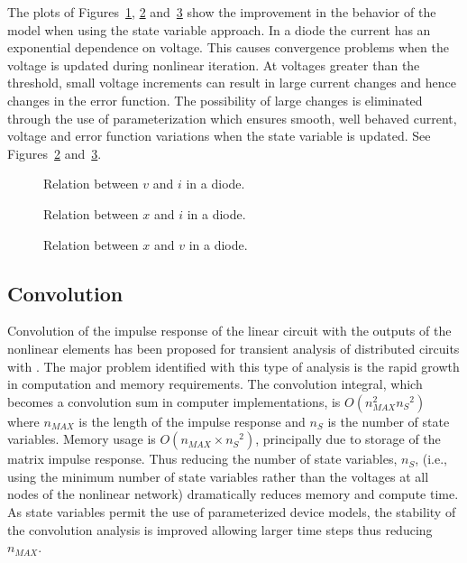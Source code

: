 The plots of Figures~\ref{fig:vi}, \ref{fig:xi} and~\ref{fig:xv} show
the improvement in the behavior of the model when using the state
variable approach. In a diode the current has an exponential
dependence on voltage. This causes convergence problems when the
voltage is updated during nonlinear iteration. At voltages greater
than the threshold, small voltage increments can result in large
current changes and hence changes in the error function. The
possibility of large changes is eliminated through the use of
parameterization which ensures smooth, well behaved current, voltage
and error function variations when the state variable is updated. See
Figures~\ref{fig:xi} and~\ref{fig:xv}.
%
\begin{figure}[htpb]
\centerline{\epsfxsize=3.5in }
\caption{Relation between $v$ and $i$ in a diode.} \label{fig:vi}
\end{figure}
%
\begin{figure}[htpb]
\centerline{\epsfxsize=3.5in }
\caption{Relation between $x$ and $i$ in a diode.} \label{fig:xi}
\end{figure}
%
\begin{figure}[htpb]
\centerline{\epsfxsize=3.5in }
\caption{Relation between $x$ and $v$ in a diode.} \label{fig:xv}
\end{figure}
%



\subsection{Convolution}

Convolution of the impulse response of the linear circuit with the
outputs of the nonlinear elements has been proposed for transient
analysis of distributed circuits with
\cite{theta,Brazil:New,gamma,delta,alpha,basel:paper,Blazeck:Mittra}. The
major problem identified with this type of analysis is the rapid
growth in computation and memory requirements. The convolution
integral, which becomes a convolution sum in computer implementations,
is $O(n_{MAX}^2 {n_S}^2)$ where $n_{MAX}$ is the length of the impulse
response and $n_S$ is the number of state variables. Memory usage is
$O(n_{MAX} \times {n_S}^2)$, principally due to storage of the matrix
impulse response. Thus reducing the number of state variables, $n_S$,
(i.e., using the minimum number of state variables rather than the
voltages at all nodes of the nonlinear network) dramatically reduces
memory and compute time. As state variables permit the use of
parameterized device models, the stability of the convolution analysis
is improved allowing larger time steps thus reducing $n_{MAX}$.

